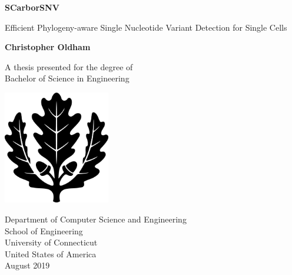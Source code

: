 \begin{titlepage}
   \begin{center}
       \vspace*{1cm}
 
       \Huge
       \textbf{SCarborSNV}
 
       \LARGE
       \vspace{0.5cm}
       Efficient Phylogeny-aware Single Nucleotide Variant Detection for Single Cells
 
       \vspace{1.6cm}
 
       \textbf{Christopher Oldham}
 
       \vspace{1.3cm}
 
       \Large
       A thesis presented for the degree of\\
       Bachelor of Science in Engineering
 
       \vspace{1.5cm}
 
       \includegraphics[width=0.35\textwidth]{oakleafblack}

       \vspace{1.5cm}
 
       Department of Computer Science and Engineering\\
       School of Engineering\\
       University of Connecticut\\
       United States of America\\
       August 2019
 
   \end{center}
\end{titlepage}
